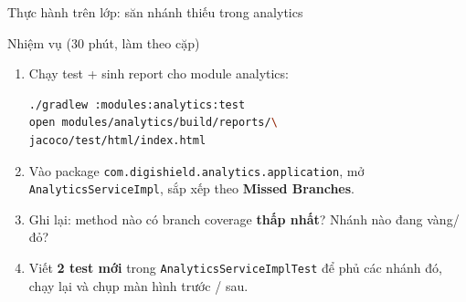 \documentclass[aspectratio=169,12pt]{beamer}
\begin{document}
\begin{frame}[fragile]{Thực hành trên lớp: săn nhánh thiếu trong analytics}
  \begin{block}{Nhiệm vụ (30 phút, làm theo cặp)}
    \begin{enumerate}
      \item Chạy test + sinh report cho module analytics:
\begin{lstlisting}[language=bash,basicstyle=\ttfamily\footnotesize]
./gradlew :modules:analytics:test
open modules/analytics/build/reports/\
jacoco/test/html/index.html
\end{lstlisting}
      \item Vào package \texttt{com.digishield.analytics.application},
            mở \texttt{AnalyticsServiceImpl}, sắp xếp theo
            \textbf{Missed Branches}.
      \item Ghi lại: method nào có branch coverage \textbf{thấp nhất}?
            Nhánh nào đang vàng/đỏ?
      \item Viết \textbf{2 test mới} trong
            \texttt{AnalyticsServiceImplTest} để phủ các nhánh đó,
            chạy lại và chụp màn hình trước / sau.
    \end{enumerate}
  \end{block}
\end{frame}
\end{document}
